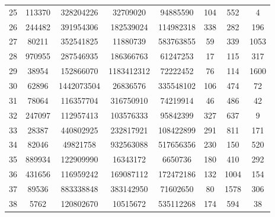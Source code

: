 \documentclass[11pt]{scrartcl}
\theoremstyle{dotlessP}
\theoremstyle{dotlessN}
\theoremstyle{dotN}
\begin{document}
\begin{table}[H]
{\begin{tabular}{c|c|c|c|c|c|c|c}
25            & 113370      & 328204226       & 32709020      & 94885590            & 104                & 552              & 4                      \\
26            & 244482      & 391954306       & 182539024     & 114982318           & 338                & 282              & 196                    \\
27            & 80211       & 352541825       & 11880739      & 583763855           & 59                 & 339              & 1053                   \\
28            & 970955      & 287546935       & 186366763     & 61247253            & 17                 & 115              & 317                    \\
29            & 38954       & 152866070       & 1183412312    & 72222452            & 76                 & 114              & 1600                   \\
30            & 62896       & 1442073504      & 26836576      & 335548102           & 106                & 474              & 72                     \\
31            & 78064       & 116357704       & 316750910     & 74219914            & 46                 & 486              & 42                     \\
32            & 247097      & 112957413       & 103576333     & 95842399            & 327                & 637              & 9                      \\
33            & 28387       & 440802925       & 232817921     & 108422899           & 291                & 811              & 171                    \\
34            & 82046       & 49821758        & 932563088     & 517656356           & 230                & 150              & 520                    \\
35            & 889934      & 122909990       & 16343172      & 6650736             & 180                & 410              & 292                    \\
36            & 431656      & 116959242       & 169087112     & 172472186           & 132                & 1004             & 154                    \\
37            & 89536       & 883338848       & 383142950     & 71602650            & 80                 & 1578             & 306                    \\
38            & 5762        & 120802670       & 10515672      & 535112268           & 174                & 594              & 38                     \\

\end{tabular}}
\end{table}
\end{document}
